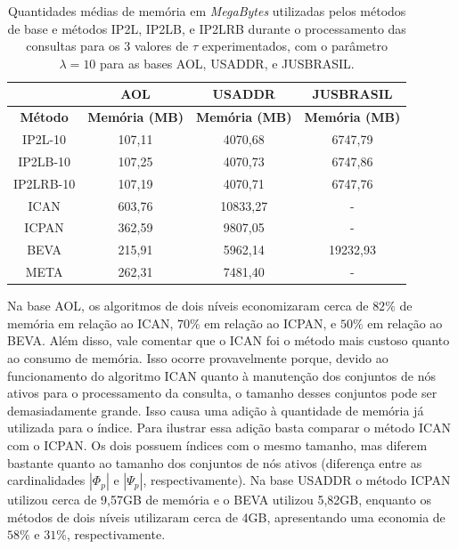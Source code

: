 \begin{table}[h]
\centering
\begin{tabular}{c|c|c|c|}
\cline{2-4}
\multicolumn{1}{l|}{} & \textbf{AOL} & \textbf{USADDR} & \textbf{JUSBRASIL} \\ \hline
\multicolumn{1}{|c|}{\textbf{Método}} & \textbf{Memória (MB)} & \textbf{Memória (MB)} & \textbf{Memória (MB)} \\ \hline
\multicolumn{1}{|c|}{IP2L-10} & 107,11 & 4070,68 & 6747,79 \\ \hline
\multicolumn{1}{|c|}{IP2LB-10} & 107,25 & 4070,73 & 6747,86 \\ \hline
\multicolumn{1}{|c|}{IP2LRB-10} & 107,19 & 4070,71 & 6747,76 \\ \hline
\multicolumn{1}{|c|}{ICAN} & 603,76 & 10833,27 & - \\ \hline
\multicolumn{1}{|c|}{ICPAN} & 362,59 & 9807,05 & - \\ \hline
\multicolumn{1}{|c|}{BEVA} & 215,91 & 5962,14 & 19232,93 \\ \hline
\multicolumn{1}{|c|}{META} & 262,31 & 7481,40 & - \\ \hline
\end{tabular}
\caption{Quantidades médias de memória em \textit{MegaBytes} utilizadas pelos métodos de base e métodos IP2L, IP2LB, e IP2LRB durante o processamento das consultas para os 3 valores de $\tau$ experimentados, com o parâmetro $\lambda=10$ para as bases AOL, USADDR, e JUSBRASIL.}
\label{tab:baselines-memory-consumption}
\end{table}

Na base AOL, os algoritmos de dois níveis economizaram cerca de $82\%$ de memória em relação ao ICAN, $70\%$ em relação ao ICPAN, e $50\%$ em relação ao BEVA. Além disso, vale comentar que o ICAN foi o método mais custoso quanto ao consumo de memória. Isso ocorre provavelmente porque, devido ao funcionamento do algoritmo ICAN quanto à manutenção dos conjuntos de nós ativos para o processamento da consulta, o tamanho desses conjuntos pode ser demasiadamente grande. Isso causa uma adição à quantidade de memória já utilizada para o índice. Para ilustrar essa adição basta comparar o método ICAN com o ICPAN. Os dois possuem índices com o mesmo tamanho, mas diferem bastante quanto ao tamanho dos conjuntos de nós ativos (diferença entre as cardinalidades $|\Phi_{p}|$ e $|\Psi_{p}|$, respectivamente). Na base USADDR o método ICPAN utilizou cerca de 9,57GB de memória e o BEVA utilizou 5,82GB, enquanto os métodos de dois níveis utilizaram cerca de 4GB, apresentando uma economia de $58\%$ e $31\%$, respectivamente. 

